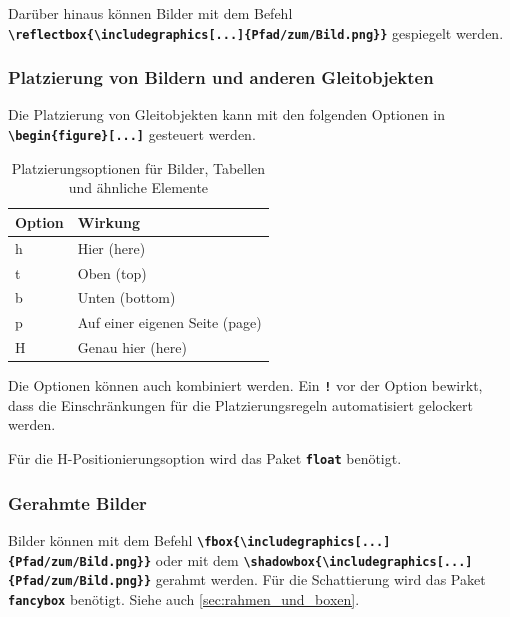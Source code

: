 Darüber hinaus können Bilder mit dem Befehl \texttt{\textbf{\textbackslash reflectbox\{\textbackslash includegraphics[...]\{Pfad/zum/Bild.png\}\}}} gespiegelt werden.

\subsubsection{Platzierung von Bildern und anderen Gleitobjekten}
Die Platzierung von Gleitobjekten kann mit den folgenden Optionen in \textbf{\texttt{\textbackslash begin\{figure\}[...]}} gesteuert werden.

\begin{table}[H]
    \centering
    \begin{tabular}{ll}
        \toprule
        \textbf{Option} & \textbf{Wirkung}               \\
        \midrule
        h               & Hier (here)                    \\
        t               & Oben (top)                     \\
        b               & Unten (bottom)                 \\
        p               & Auf einer eigenen Seite (page) \\
        H               & Genau hier (here)              \\
        \bottomrule
    \end{tabular}
    \caption{Platzierungsoptionen für Bilder, Tabellen und ähnliche Elemente}
    \label{tab:figure_options}
\end{table}
Die Optionen können auch kombiniert werden. Ein \textbf{\texttt{!}} vor der Option bewirkt, dass die Einschränkungen für die Platzierungsregeln automatisiert gelockert werden.

Für die H-Positionierungsoption wird das Paket \textbf{\texttt{float}} benötigt.

\newpage

\subsubsection{Gerahmte Bilder}
Bilder können mit dem Befehl \textbf{\texttt{\textbackslash fbox\{\textbackslash includegraphics[...]\{Pfad/zum/Bild.png\}\}}} oder mit dem \textbf{\texttt{\textbackslash shadowbox\{\textbackslash includegraphics[...]\{Pfad/zum/Bild.png\}\}}} gerahmt werden. Für die Schattierung wird das Paket \textbf{\texttt{fancybox}} benötigt. Siehe auch \autoref{sec:rahmen_und_boxen}.

